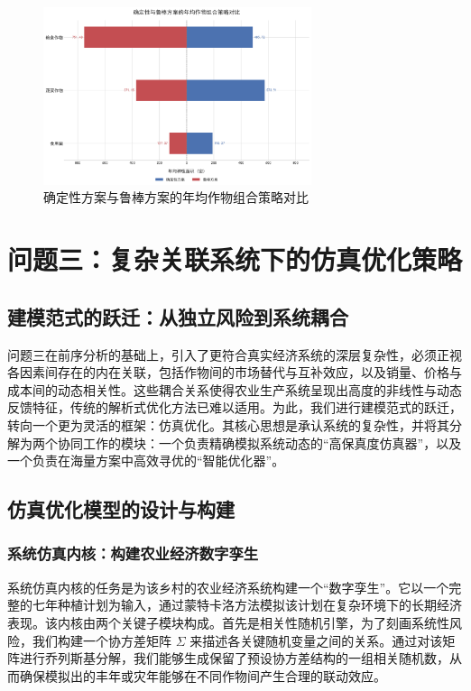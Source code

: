 \documentclass[withoutpreface,bwprint]{cumcmthesis} %
\begin{document}
\begin{figure}[htbp]
	\centering
	\includegraphics[width=0.7\textwidth]{figures/2_2.png}
	\caption{确定性方案与鲁棒方案的年均作物组合策略对比}
	\label{fig:2_2}
\end{figure}


\section{问题三：复杂关联系统下的仿真优化策略}

\subsection{建模范式的跃迁：从独立风险到系统耦合}

问题三在前序分析的基础上，引入了更符合真实经济系统的深层复杂性，必须正视各因素间存在的内在关联，包括作物间的市场替代与互补效应，以及销量、价格与成本间的动态相关性。这些耦合关系使得农业生产系统呈现出高度的非线性与动态反馈特征，传统的解析式优化方法已难以适用。为此，我们进行建模范式的跃迁，转向一个更为灵活的框架：仿真优化。其核心思想是承认系统的复杂性，并将其分解为两个协同工作的模块：一个负责精确模拟系统动态的“高保真度仿真器”，以及一个负责在海量方案中高效寻优的“智能优化器”。

\subsection{仿真优化模型的设计与构建}

\subsubsection{系统仿真内核：构建农业经济数字孪生}

系统仿真内核的任务是为该乡村的农业经济系统构建一个“数字孪生”。它以一个完整的七年种植计划为输入，通过蒙特卡洛方法模拟该计划在复杂环境下的长期经济表现。该内核由两个关键子模块构成。首先是相关性随机引擎，为了刻画系统性风险，我们构建一个协方差矩阵 $\Sigma$ 来描述各关键随机变量之间的关系。通过对该矩阵进行乔列斯基分解，我们能够生成保留了预设协方差结构的一组相关随机数，从而确保模拟出的丰年或灾年能够在不同作物间产生合理的联动效应。
\end{document}
